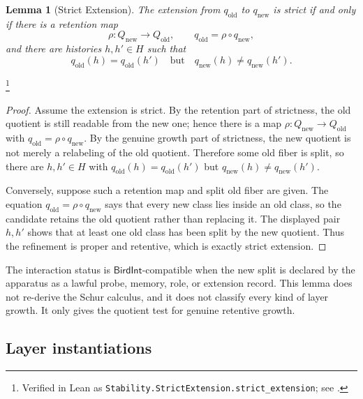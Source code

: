 \documentclass[11pt]{article}
\newcommand{\currQ}{Q}                 \newcommand{\predM}{M}                 \newcommand{\splitObs}{\Delta}         \newcommand{\quotMap}{\pi}             \newcommand{\accessQ}{q_I}             \newcommand{\obsSig}{\sigma_I}         \newcommand{\closureForm}{\mathsf{cl}} \newcommand{\BirdInt}{\mathsf{BirdInt}}
\newtheorem{lemma}[theorem]{Lemma}
\theoremstyle{definition}
\begin{document}
\begin{lemma}[Strict Extension]\label{lem:F8}
The extension from \(q_{\mathrm{old}}\) to \(q_{\mathrm{new}}\) is
strict if and only if there is a retention map
\[
  \rho:\currQ_{\mathrm{new}}\to \currQ_{\mathrm{old}},
  \qquad
  q_{\mathrm{old}}=\rho\circ q_{\mathrm{new}},
\]
and there are histories \(h,h'\in H\) such that
\[
  q_{\mathrm{old}}(h)=q_{\mathrm{old}}(h')
  \quad\text{but}\quad
  q_{\mathrm{new}}(h)\ne q_{\mathrm{new}}(h').
\]
\end{lemma}
\footnote{Verified in Lean as
\texttt{Stability.StrictExtension.\allowbreak{}strict\_extension};
see .}
\begin{proof}
Assume the extension is strict.  By the retention part of strictness,
the old quotient is still readable from the new one; hence there is
a map \(\rho:\currQ_{\mathrm{new}}\to\currQ_{\mathrm{old}}\) with
\(q_{\mathrm{old}}=\rho\circ q_{\mathrm{new}}\).  By the genuine
growth part of strictness, the new quotient is not merely a relabeling
of the old quotient.  Therefore some old fiber is split, so there
are \(h,h'\in H\) with \(q_{\mathrm{old}}(h)=q_{\mathrm{old}}(h')\)
but \(q_{\mathrm{new}}(h)\ne q_{\mathrm{new}}(h')\).

Conversely, suppose such a retention map and split old fiber are
given.  The equation \(q_{\mathrm{old}}=\rho\circ q_{\mathrm{new}}\)
says that every new class lies inside an old class, so the candidate
retains the old quotient rather than replacing it.  The displayed
pair \(h,h'\) shows that at least one old class has been split by
the new quotient.  Thus the refinement is proper and retentive,
which is exactly strict extension.
\end{proof}

The interaction status is \(\BirdInt\)-compatible when the new split
is declared by the apparatus as a lawful probe, memory, role, or
extension record.  This lemma does not re-derive the Schur calculus,
and it does not classify every kind of layer growth.  It only gives
the quotient test for genuine retentive growth.

\subsection*{Layer instantiations}\label{layer-inst:F8}
\end{document}
